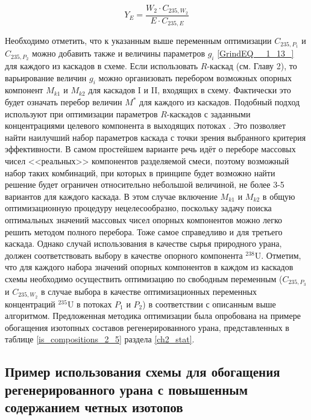 \begin{equation} \label{RecR2} 
    Y_{E} = \frac{W_2\cdot C_{235,W_2}}{E \cdot C_{235,E}}        
\end{equation} 

Необходимо отметить, что к указанным выше переменным оптимизации $C_{235,{P_1}}$ и $C_{235,{P_2}}$ можно добавить также и величины параметров $g_{i}$  \ref{GrindEQ__1_13_} для каждого из каскадов в схеме. Если использовать $R$-каскад (см. Главу 2), то варьирование величин $g_{i}$ можно организовать перебором возможных опорных компонент $M_{k1}$ и $M_{k2}$ для каскадов I и II, входящих в схему. Фактически это будет означать перебор величин $M^{*}$ для каждого из каскадов. Подобный подход используют при оптимизации параметров $R$-каскадов с заданными концентрациями целевого компонента в выходящих потоках \cite{songComparativeStudyModel2010, sulaberidzeSravnenieOptimalnyhModelnyh2008}. Это позволяет найти наилучший набор параметров каскада с точки зрения выбранного критерия эффективности. В самом простейшем варианте речь идёт о переборе массовых чисел <<реальных>> компонентов разделяемой смеси, поэтому возможный набор таких комбинаций, при которых в принципе будет возможно найти решение будет ограничен относительно небольшой величиной, не более 3-5 вариантов для каждого каскада. В этом случае включение $M_{k1}$ и $M_{k2}$ в общую оптимизационную процедуру нецелесообразно, поскольку задачу поиска оптимальных значений массовых чисел опорных компонентов можно легко решить методом полного перебора. Тоже самое справедливо и для третьего каскада.
Однако случай использования в качестве сырья природного урана, должен соответствовать выбору в качестве опорного компонента $^{238}$U. Отметим, что для каждого набора значений опорных компонентов в каждом из каскадов схемы необходимо осуществить оптимизацию по свободным переменным ($C_{235,P_3}$ и $C_{235,W_2}$ в случае выбора в качестве оптимизационных переменных концентраций $^{235}$U в потоках $P_1$ и $P_2$) в соответствии с описанным выше алгоритмом. 
Предложенная методика оптимизации была опробована на примере обогащения изотопных составов регенерированного урана, представленных в таблице \ref{is_compositions_2_5} раздела \ref{ch2_stat}.

\subsection{Пример использования схемы для обогащения регенерированного урана с повышенным содержанием четных изотопов}\label{example_trip}

